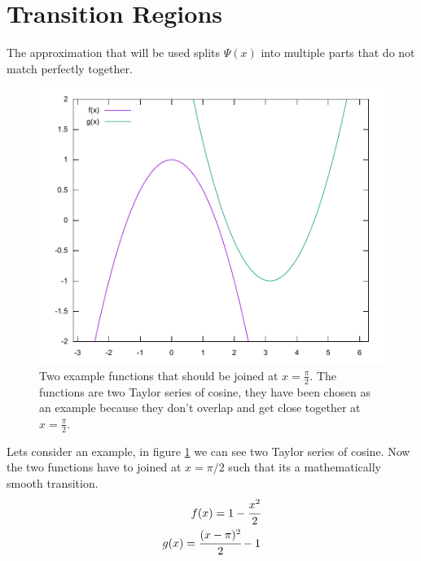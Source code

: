 \documentclass[11pt,DIV=10,final]{scrreprt} %
\begin{document}
\section{Transition Regions}
The approximation that will be used splits $\Psi(x)$ into multiple parts that do not match perfectly together.

\begin{figure}[h]
  \centering
  \includegraphics[width=.9\textwidth]{plots/cos_taylor.pdf}
  \caption{Two example functions that should be joined at $x=\frac{\pi}{2}$. The functions are two Taylor series of cosine, they have been chosen as an example because they don't overlap and get
  close together at $x = \frac{\pi}{2}.$}\label{fig:cos_taylor}
\end{figure}

Lets consider an example, in figure \ref{fig:cos_taylor} we can see two Taylor series of cosine. Now the two functions have to joined at $x = \pi / 2$ such that its a mathematically smooth transition.
\begin{align}
  \label{joint:f}
  f(x) = 1 - \cfrac{x^{2}}{2} \\
  \label{joint:g}
  g(x) = \cfrac{(x - \pi)^{2}}{2} -  1
\end{align}
\end{document}
